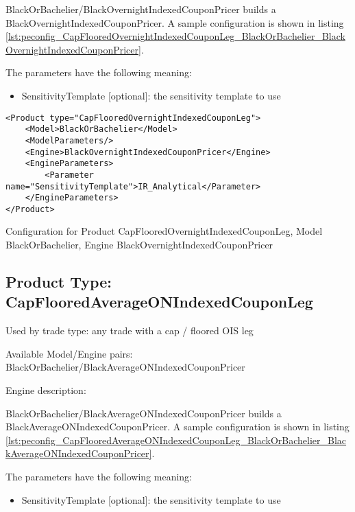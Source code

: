 BlackOrBachelier/BlackOvernightIndexedCouponPricer builds a BlackOvernightIndexedCouponPricer. A sample configuration is
shown in listing \ref{lst:peconfig_CapFlooredOvernightIndexedCouponLeg_BlackOrBachelier_BlackOvernightIndexedCouponPricer}.

The parameters have the following meaning:

\begin{itemize}
\item SensitivityTemplate [optional]: the sensitivity template to use 
\end{itemize}

\begin{longlisting}
\begin{verbatim}
<Product type="CapFlooredOvernightIndexedCouponLeg">
    <Model>BlackOrBachelier</Model>
    <ModelParameters/>
    <Engine>BlackOvernightIndexedCouponPricer</Engine>
    <EngineParameters>
        <Parameter name="SensitivityTemplate">IR_Analytical</Parameter>
    </EngineParameters>
</Product>
\end{verbatim}
\caption{Configuration for Product CapFlooredOvernightIndexedCouponLeg, Model BlackOrBachelier, Engine BlackOvernightIndexedCouponPricer}
\label{lst:peconfig_CapFlooredOvernightIndexedCouponLeg_BlackOrBachelier_BlackOvernightIndexedCouponPricer}
\end{longlisting}

\subsection{Product Type: CapFlooredAverageONIndexedCouponLeg}

Used by trade type: any trade with a cap / floored OIS leg

Available Model/Engine pairs: BlackOrBachelier/BlackAverageONIndexedCouponPricer

Engine description:

BlackOrBachelier/BlackAverageONIndexedCouponPricer builds a BlackAverageONIndexedCouponPricer. A sample configuration is
shown in listing \ref{lst:peconfig_CapFlooredAverageONIndexedCouponLeg_BlackOrBachelier_BlackAverageONIndexedCouponPricer}.

The parameters have the following meaning:

\begin{itemize}
\item SensitivityTemplate [optional]: the sensitivity template to use 
\end{itemize}

